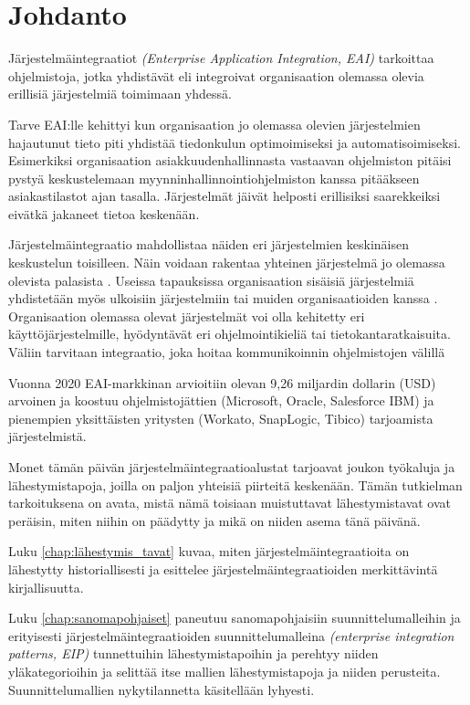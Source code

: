 
\chapter{Johdanto}


Järjestelmäintegraatiot \textit{(Enterprise Application Integration, EAI)} tarkoittaa ohjelmistoja, 
jotka yhdistävät eli integroivat organisaation olemassa olevia erillisiä järjestelmiä toimimaan yhdessä.

Tarve EAI:lle kehittyi kun organisaation jo olemassa olevien
järjestelmien hajautunut tieto piti yhdistää tiedonkulun optimoimiseksi ja
automatisoimiseksi. Esimerkiksi organisaation asiakkuudenhallinnasta vastaavan ohjelmiston
pitäisi pystyä keskustelemaan myynninhallinnointiohjelmiston kanssa pitääkseen
asiakastilastot ajan tasalla. 
Järjestelmät jäivät helposti erillisiksi saarekkeiksi eivätkä jakaneet tietoa keskenään. 

Järjestelmäintegraatio mahdollistaa näiden eri järjestelmien keskinäisen keskustelun toisilleen. Näin voidaan rakentaa yhteinen järjestelmä jo olemassa olevista palasista \citep[sivu 15]{linthicum2000enterprise}. Useissa tapauksissa organisaation sisäisiä järjestelmiä yhdistetään myös ulkoisiin järjestelmiin tai muiden organisaatioiden kanssa \citep{Johannesson2001}.
Organisaation olemassa olevat järjestelmät voi olla kehitetty eri käyttöjärjestelmille, hyödyntävät eri
ohjelmointikieliä tai tietokantaratkaisuita. Väliin tarvitaan integraatio, joka hoitaa
kommunikoinnin ohjelmistojen välillä


Vuonna 2020 EAI-markkinan arvioitiin olevan 9,26 miljardin dollarin (USD) arvoinen \citep{mordorintelligence} ja koostuu ohjelmistojättien (Microsoft, Oracle, Salesforce IBM) ja pienempien yksittäisten yritysten (Workato, SnapLogic, Tibico) tarjoamista järjestelmistä.

Monet tämän päivän järjestelmäintegraatioalustat tarjoavat joukon työkaluja ja lähestymistapoja, joilla on paljon yhteisiä piirteitä keskenään. Tämän tutkielman tarkoituksena on avata, mistä nämä toisiaan muistuttavat lähestymistavat ovat peräisin, miten niihin on päädytty ja mikä on niiden asema tänä päivänä.

Luku \ref{chap:lähestymis_tavat} kuvaa, miten järjestelmäintegraatioita on lähestytty historiallisesti ja esittelee järjestelmäintegraatioiden merkittävintä kirjallisuutta.

Luku \ref{chap:sanomapohjaiset} paneutuu sanomapohjaisiin suunnittelumalleihin ja erityisesti järjestelmäintegraatioiden suunnittelumalleina \textit{(enterprise integration patterns, EIP)} tunnettuihin lähestymistapoihin ja perehtyy niiden yläkategorioihin ja selittää itse mallien lähestymistapoja ja niiden perusteita. Suunnittelumallien nykytilannetta käsitellään lyhyesti.

